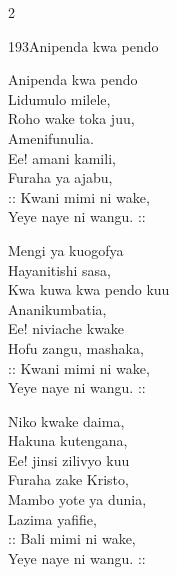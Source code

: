 \documentclass{article}
\begin{document}
\begin{multicols}{2}
\begin{hymn}{193}{Anipenda kwa pendo}{}
\begin{stanza}
Anipenda kwa pendo\\
Lidumulo milele,\\
Roho wake toka juu,\\
Amenifunulia.\\
Ee! amani kamili,\\
Furaha ya ajabu,\\
:: Kwani mimi ni wake,\\
Yeye naye ni wangu. ::
\end{stanza}
\begin{stanza}
Mengi ya kuogofya\\
Hayanitishi sasa,\\
Kwa kuwa kwa pendo kuu\\
Ananikumbatia,\\
Ee! niviache kwake\\
Hofu zangu, mashaka,\\
:: Kwani mimi ni wake,\\
Yeye naye ni wangu. ::
\end{stanza}
\begin{stanza}
Niko kwake daima,\\
Hakuna kutengana,\\
Ee! jinsi zilivyo kuu\\
Furaha zake Kristo,\\
Mambo yote ya dunia,\\
Lazima yafifie,\\
:: Bali mimi ni wake,\\
Yeye naye ni wangu. ::
\end{stanza}
\end{hymn}


\end{multicols}
\end{document}
